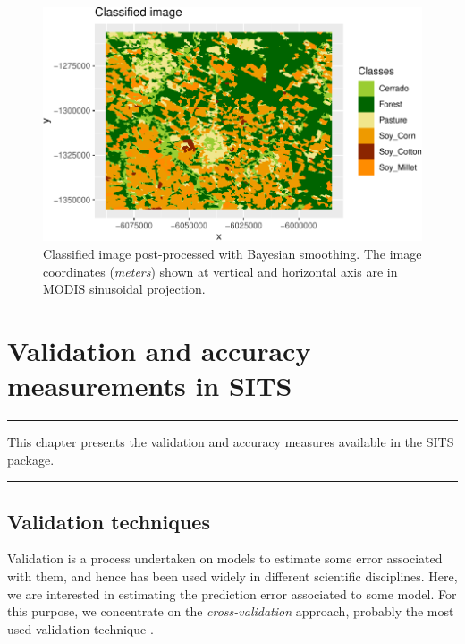 \documentclass[a4paper,]{tufte-book}
\begin{document}
\begin{figure}

{\centering \includegraphics[width=0.9\linewidth]{sitsbook_files/figure-latex/unnamed-chunk-70-1} 

}

\caption[Classified image post-processed with Bayesian smoothing]{Classified image post-processed with Bayesian smoothing. The image coordinates ({\it meters}) shown at vertical and horizontal axis are in MODIS sinusoidal projection.}\label{fig:unnamed-chunk-70}
\end{figure}

\hypertarget{validation-and-accuracy-measurements-in-sits}{%
\chapter{Validation and accuracy measurements in SITS}\label{validation-and-accuracy-measurements-in-sits}}

\begin{center}\rule{0.5\linewidth}{0.5pt}\end{center}

This chapter presents the validation and accuracy measures available in the SITS package.

\begin{center}\rule{0.5\linewidth}{0.5pt}\end{center}

\hypertarget{validation-techniques-1}{%
\section{Validation techniques}\label{validation-techniques-1}}

Validation is a process undertaken on models to estimate some error associated with them, and hence has been used widely in different scientific disciplines. Here, we are interested in estimating the prediction error associated to some model. For this purpose, we concentrate on the \emph{cross-validation} approach, probably the most used validation technique \citep{Hastie2009}.
\end{document}
